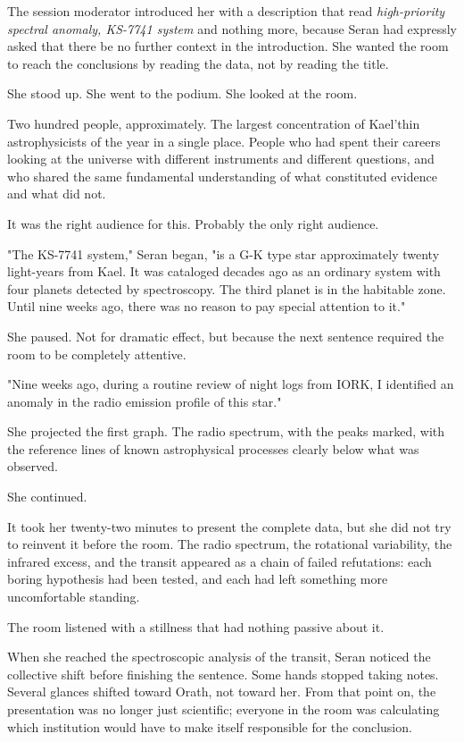 \documentclass[11pt,a5paper,twoside]{book}
\begin{document}
The session moderator introduced her with a description that read \textit{high-priority spectral anomaly, KS-7741 system} and nothing more, because Seran had expressly asked that there be no further context in the introduction. She wanted the room to reach the conclusions by reading the data, not by reading the title.

She stood up. She went to the podium. She looked at the room.

Two hundred people, approximately. The largest concentration of Kael'thin astrophysicists of the year in a single place. People who had spent their careers looking at the universe with different instruments and different questions, and who shared the same fundamental understanding of what constituted evidence and what did not.

It was the right audience for this. Probably the only right audience.

"The KS-7741 system," Seran began, "is a G-K type star approximately twenty light-years from Kael. It was cataloged decades ago as an ordinary system with four planets detected by spectroscopy. The third planet is in the habitable zone. Until nine weeks ago, there was no reason to pay special attention to it."

She paused. Not for dramatic effect, but because the next sentence required the room to be completely attentive.

"Nine weeks ago, during a routine review of night logs from IORK, I identified an anomaly in the radio emission profile of this star."

She projected the first graph. The radio spectrum, with the peaks marked, with the reference lines of known astrophysical processes clearly below what was observed.

She continued.

It took her twenty-two minutes to present the complete data, but she did not try to reinvent it before the room. The radio spectrum, the rotational variability, the infrared excess, and the transit appeared as a chain of failed refutations: each boring hypothesis had been tested, and each had left something more uncomfortable standing.

The room listened with a stillness that had nothing passive about it.

When she reached the spectroscopic analysis of the transit, Seran noticed the collective shift before finishing the sentence. Some hands stopped taking notes. Several glances shifted toward Orath, not toward her. From that point on, the presentation was no longer just scientific; everyone in the room was calculating which institution would have to make itself responsible for the conclusion.
\end{document}
